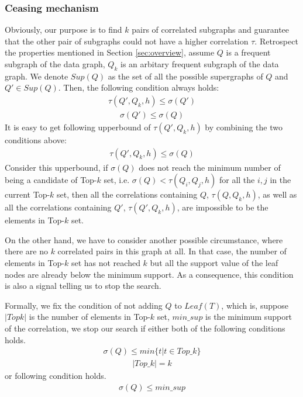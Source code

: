 \subsubsection{Ceasing mechanism}\label{subsubsec:ceasing}
Obviously, our purpose is to find $k$ pairs of correlated subgraphs and guarantee that the other pair of subgraphs could not have a higher correlation $\tau$. Retrospect the properties mentioned in Section \ref{sec:overview}, assume $Q$ is a frequent subgraph of the data graph, $Q_k$ is an arbitary frequent subgraph of the data graph. We denote $Sup(Q)$ as the set of all the possible supergraphs of $Q$ and $Q'\in Sup(Q)$. Then, the following condition always holds:
	\begin{align*} \tau(Q',Q_k,h)\le \sigma(Q') \end{align*}
	\begin{align*} \sigma(Q')\le \sigma(Q) \end{align*}
	It is easy to get following upperbound of $\tau(Q',Q_k,h)$ by combining the two conditions above:
	\begin{align*} \tau(Q',Q_k,h) \le \sigma(Q) \end{align*}
Consider this upperbound, if $\sigma(Q)$ does not reach the minimum number of being a candidate of {\sf Top-$k$} set, i.e. $\sigma(Q)<\tau(Q_i,Q_j,h)$ for all the $i, j$ in the current {\sf Top-$k$} set, then all the correlations containing $Q$, $\tau(Q,Q_k,h)$, as well as all the correlations containing $Q'$, $\tau(Q',Q_k,h)$, are impossible to be the elements in {\sf Top-$k$} set. 
\par On the other hand, we have to consider another possible circumstance, where there are no $k$ correlated pairs in this graph at all. In that case, the number of elements in {\sf Top-$k$} set has not reached $k$ but all the support value of the leaf nodes are already below the minimum support. As a consequence, this condition is also a signal telling us to stop the search.
\par Formally, we fix the condition of not adding $Q$ to $Leaf(T)$, which is, suppose $|Topk|$ is the number of elements in {\sf Top-$k$} set, $min\_sup$ is the minimum support of the correlation, we stop our search if either both of the following conditions holds.
\begin{align*} \sigma(Q)\le min\{t|t\in Top\_k\}\end{align*}
\begin{align*} |Top\_k|=k \end{align*}
or following condition holds.
\begin{align*} \sigma(Q)\le min\_sup\end{align*}
